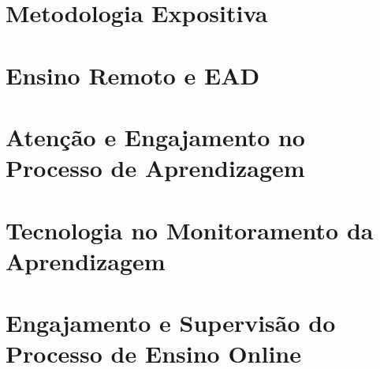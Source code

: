 \section{Metodologia Expositiva}


\section{Ensino Remoto e EAD}


\section{Atenção e Engajamento no Processo de Aprendizagem}\label{sec:2.atencao-engajamento}


\section{Tecnologia no Monitoramento da Aprendizagem}\label{sec:2.tecnologia-no-monitoramento-aprendizagem}

\section{Engajamento e Supervisão do Processo de Ensino Online}\label{sec:2.espeon}

